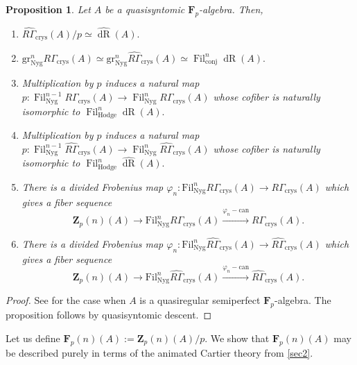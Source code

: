 \documentclass[10pt,letterpaper]{amsart}
\numberwithin{figure}{section}
\numberwithin{equation}{section}
\newtheorem{proposition}[figure]{Proposition}
\theoremstyle{definition}
\theoremstyle{definition}
\theoremstyle{definition}
\theoremstyle{definition}
\DeclareMathOperator{\crys}{crys}
\DeclareMathOperator{\conj}{conj}
\DeclareMathOperator{\Hodge}{Hodge}
\DeclareMathOperator{\Fil}{Fil}
\DeclareMathOperator{\dR}{dR}
\newcommand{\Z}{\mathbf{Z}}
\newcommand{\F}{\mathbf{F}}
\begin{document}
\begin{proposition}
    Let $A$ be a quasisyntomic $\F_p$-algebra. Then,


\begin{enumerate}

\item $\widehat{R\Gamma}_{\crys}(A)/p \simeq \widehat{\dR}(A).$


\item $\mathrm{gr}^n_{\mathrm{Nyg}} R\Gamma_{\crys}(A) \simeq \mathrm{gr}^n_{\mathrm{Nyg}} \widehat{R\Gamma}_{\crys}(A) \simeq \Fil^n_{\conj} \dR(A). $

\item Multiplication by $p$ induces a natural map $p: 
\Fil^{n-1}_{\mathrm{Nyg}}R\Gamma_{\crys}(A) \to \Fil^{n}_{\mathrm{Nyg}}R\Gamma_{\crys}(A)$ whose cofiber is naturally isomorphic to $\Fil^n_{\Hodge} \dR(A).$

\item Multiplication by $p$ induces a natural map $p: 
\Fil^{n-1}_{\mathrm{Nyg}}\widehat{R\Gamma}_{\crys}(A) \to \Fil^{n}_{\mathrm{Nyg}}\widehat{R\Gamma}_{\crys}(A)$ whose cofiber is naturally isomorphic to $\Fil^n_{\Hodge} \widehat{\dR}(A).$

\item There is a divided Frobenius map $\varphi_n: \mathrm{Fil}^n_{\mathrm{Nyg}} R\Gamma_{\crys} (A) \to R\Gamma_{\crys}(A)$ which gives a fiber sequence
$$ \Z _p(n)(A) \xrightarrow{}\mathrm{Fil}^n_{\mathrm{Nyg}}{R\Gamma}_{\crys} (A) \xrightarrow{\varphi_n - \mathrm{can}}  R\Gamma_{\crys}(A).$$

\item There is a divided Frobenius map $\varphi_n: \mathrm{Fil}^n_{\mathrm{Nyg}} \widehat{R\Gamma}_{\crys} (A) \to \widehat{R\Gamma}_{\crys}(A)$ which gives a fiber sequence
$$ \Z _p(n) (A)\xrightarrow{}\mathrm{Fil}^n_{\mathrm{Nyg}}\widehat{R\Gamma}_{\crys}(A)  \xrightarrow{\varphi_n - \mathrm{can}}  \widehat{R\Gamma}_{\crys}(A).$$
\end{enumerate}{}
\end{proposition}{}


\begin{proof}
    See \cite[\S~8]{BMS2} for the case when $A$ is a quasiregular semiperfect $\F_p$-algebra. The proposition follows by quasisyntomic descent.
\end{proof}{}


Let us define $\F_p (n) (A) := \Z_p (n)(A)/p.$ We show that $\F_p (n) (A)$ may be described purely in terms of the animated Cartier theory from \cref{sec2}.
\end{document}
